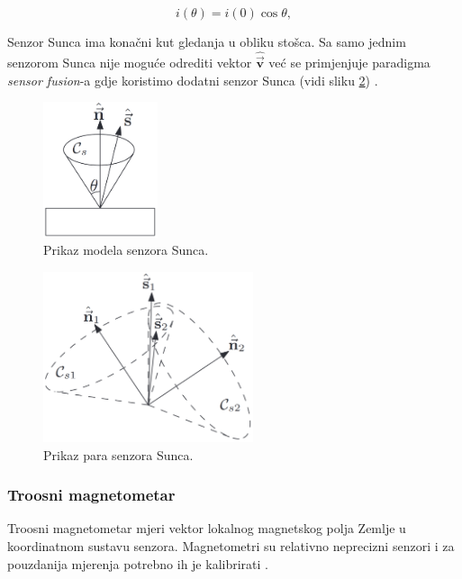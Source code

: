 \documentclass[times, utf8, diplomski, numeric]{templates/template}
\begin{document}
{{{{                \begin{equation}
                    i(\theta) = i(0)\cos\theta,
                \end{equation}

                Senzor Sunca ima konačni kut gledanja u obliku stošca. Sa samo jednim senzorom Sunca nije moguće odrediti vektor $\hat{\overrightarrow{\boldsymbol{v}}}$ već se primjenjuje paradigma \emph{sensor fusion}-a gdje koristimo dodatni senzor Sunca (vidi sliku \ref{fig:sensor_sunca_sensor_fusion}) \cite{adcsKnjiga}.

                \begin{figure}[htb]
                \centering
                \includegraphics[width=0.3\textwidth]{images/sensor_sunca.png}
                \caption{Prikaz modela senzora Sunca.}
                \label{fig:sensor_sunca}
                \end{figure}

                \begin{figure}[htb]
                \centering
                \includegraphics[width=0.55\textwidth]{images/sensor_sunca_sensor_fusion.png}
                \caption{Prikaz para senzora Sunca.}
                \label{fig:sensor_sunca_sensor_fusion}
                \end{figure}
            }

            \subsubsection{Troosni magnetometar}{
            \label{subsubsection:troosni_magnetometar}
                Troosni magnetometar mjeri vektor lokalnog magnetskog polja Zemlje u koordinatnom sustavu senzora. Magnetometri su relativno neprecizni senzori i za pouzdanija mjerenja potrebno ih je kalibrirati \cite{adcsKnjiga}.

}}}}
\end{document}
